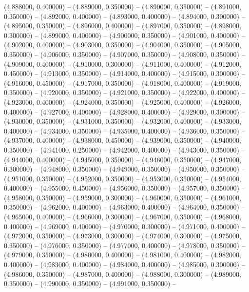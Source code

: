 (4.888000, 0.400000) -- 
(4.889000, 0.350000) -- 
(4.890000, 0.350000) -- 
(4.891000, 0.350000) -- 
(4.892000, 0.400000) -- 
(4.893000, 0.400000) -- 
(4.894000, 0.300000) -- 
(4.895000, 0.350000) -- 
(4.896000, 0.400000) -- 
(4.897000, 0.350000) -- 
(4.898000, 0.300000) -- 
(4.899000, 0.400000) -- 
(4.900000, 0.350000) -- 
(4.901000, 0.400000) -- 
(4.902000, 0.400000) -- 
(4.903000, 0.350000) -- 
(4.904000, 0.350000) -- 
(4.905000, 0.350000) -- 
(4.906000, 0.350000) -- 
(4.907000, 0.350000) -- 
(4.908000, 0.350000) -- 
(4.909000, 0.400000) -- 
(4.910000, 0.300000) -- 
(4.911000, 0.400000) -- 
(4.912000, 0.450000) -- 
(4.913000, 0.350000) -- 
(4.914000, 0.400000) -- 
(4.915000, 0.300000) -- 
(4.916000, 0.450000) -- 
(4.917000, 0.350000) -- 
(4.918000, 0.400000) -- 
(4.919000, 0.350000) -- 
(4.920000, 0.350000) -- 
(4.921000, 0.350000) -- 
(4.922000, 0.400000) -- 
(4.923000, 0.400000) -- 
(4.924000, 0.350000) -- 
(4.925000, 0.400000) -- 
(4.926000, 0.400000) -- 
(4.927000, 0.400000) -- 
(4.928000, 0.400000) -- 
(4.929000, 0.300000) -- 
(4.930000, 0.350000) -- 
(4.931000, 0.350000) -- 
(4.932000, 0.400000) -- 
(4.933000, 0.400000) -- 
(4.934000, 0.350000) -- 
(4.935000, 0.400000) -- 
(4.936000, 0.350000) -- 
(4.937000, 0.400000) -- 
(4.938000, 0.450000) -- 
(4.939000, 0.350000) -- 
(4.940000, 0.350000) -- 
(4.941000, 0.250000) -- 
(4.942000, 0.400000) -- 
(4.943000, 0.350000) -- 
(4.944000, 0.400000) -- 
(4.945000, 0.350000) -- 
(4.946000, 0.350000) -- 
(4.947000, 0.300000) -- 
(4.948000, 0.350000) -- 
(4.949000, 0.350000) -- 
(4.950000, 0.350000) -- 
(4.951000, 0.350000) -- 
(4.952000, 0.350000) -- 
(4.953000, 0.350000) -- 
(4.954000, 0.400000) -- 
(4.955000, 0.450000) -- 
(4.956000, 0.350000) -- 
(4.957000, 0.350000) -- 
(4.958000, 0.350000) -- 
(4.959000, 0.300000) -- 
(4.960000, 0.350000) -- 
(4.961000, 0.350000) -- 
(4.962000, 0.400000) -- 
(4.963000, 0.400000) -- 
(4.964000, 0.350000) -- 
(4.965000, 0.400000) -- 
(4.966000, 0.300000) -- 
(4.967000, 0.350000) -- 
(4.968000, 0.400000) -- 
(4.969000, 0.400000) -- 
(4.970000, 0.300000) -- 
(4.971000, 0.400000) -- 
(4.972000, 0.350000) -- 
(4.973000, 0.300000) -- 
(4.974000, 0.300000) -- 
(4.975000, 0.350000) -- 
(4.976000, 0.350000) -- 
(4.977000, 0.400000) -- 
(4.978000, 0.350000) -- 
(4.979000, 0.350000) -- 
(4.980000, 0.400000) -- 
(4.981000, 0.400000) -- 
(4.982000, 0.400000) -- 
(4.983000, 0.400000) -- 
(4.984000, 0.400000) -- 
(4.985000, 0.300000) -- 
(4.986000, 0.350000) -- 
(4.987000, 0.400000) -- 
(4.988000, 0.300000) -- 
(4.989000, 0.350000) -- 
(4.990000, 0.350000) -- 
(4.991000, 0.350000) -- 

